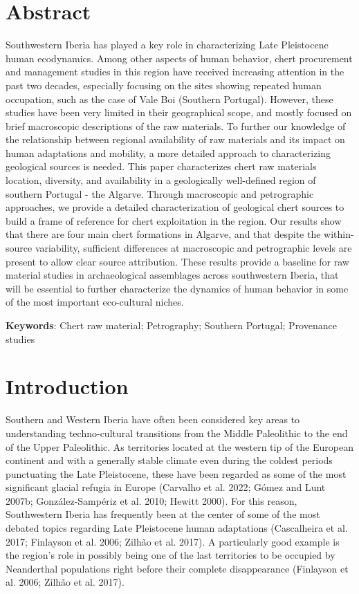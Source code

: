 \documentclass[
  a4paper,
  DIV=11,
  numbers=noendperiod]{scrreprt}
\begin{document}
\newpage

\section*{Abstract}\label{abstract-1}


Southwestern Iberia has played a key role in characterizing Late
Pleistocene human ecodynamics. Among other aspects of human behavior,
chert procurement and management studies in this region have received
increasing attention in the past two decades, especially focusing on the
sites showing repeated human occupation, such as the case of Vale Boi
(Southern Portugal). However, these studies have been very limited in
their geographical scope, and mostly focused on brief macroscopic
descriptions of the raw materials. To further our knowledge of the
relationship between regional availability of raw materials and its
impact on human adaptations and mobility, a more detailed approach to
characterizing geological sources is needed. This paper characterizes
chert raw materials location, diversity, and availability in a
geologically well-defined region of southern Portugal - the Algarve.
Through macroscopic and petrographic approaches, we provide a detailed
characterization of geological chert sources to build a frame of
reference for chert exploitation in the region. Our results show that
there are four main chert formations in Algarve, and that despite the
within-source variability, sufficient differences at macroscopic and
petrographic levels are present to allow clear source attribution. These
results provide a baseline for raw material studies in archaeological
assemblages across southwestern Iberia, that will be essential to
further characterize the dynamics of human behavior in some of the most
important eco-cultural niches.

\textbf{Keywords}: Chert raw material; Petrography; Southern Portugal;
Provenance studies

\section{Introduction}\label{introduction-1}

Southern and Western Iberia have often been considered key areas to
understanding techno-cultural transitions from the Middle Paleolithic to
the end of the Upper Paleolithic. As territories located at the western
tip of the European continent and with a generally stable climate even
during the coldest periods punctuating the Late Pleistocene, these have
been regarded as some of the most significant glacial refugia in Europe
(Carvalho et al. 2022; Gómez and Lunt 2007b; González-Sampériz et al.
2010; Hewitt 2000). For this reason, Southwestern Iberia has frequently
been at the center of some of the most debated topics regarding Late
Pleistocene human adaptations (Cascalheira et al. 2017; Finlayson et al.
2006; Zilhão et al. 2017). A particularly good example is the region's
role in possibly being one of the last territories to be occupied by
Neanderthal populations right before their complete disappearance
(Finlayson et al. 2006; Zilhão et al. 2017).
\end{document}
